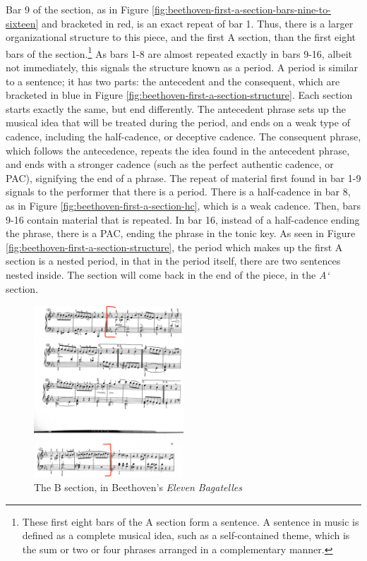 Bar 9 of the section, as in Figure \ref{fig:beethoven-first-a-section-bars-nine-to-sixteen}\autocite{Henle_1978} and bracketed in red, is an exact repeat of bar 1. Thus, there is a larger organizational structure to this piece, and the first A section, than the first eight bars of the section.\footnote{These first eight bars of the A section form a sentence. A sentence in music is defined as a complete musical idea, such as a self-contained theme, which is the sum or two or four phrases arranged in a complementary manner.} As bars 1-8 are almost repeated exactly in bars 9-16, albeit not immediately, this signals the structure known as a period. A period is similar to a sentence; it has two parts: the antecedent and the consequent, which are bracketed in blue in Figure \ref{fig:beethoven-first-a-section-structure}\autocite{Henle_1978}. Each section starts exactly the same, but end differently. The antecedent phrase sets up the musical idea that will be treated during the period, and ends on a weak type of cadence, including the half-cadence, or deceptive cadence. The consequent phrase, which follows the antecedence, repeats the idea found in the antecedent phrase, and ends with a stronger cadence (such as the perfect authentic cadence, or PAC), signifying the end of a phrase. The repeat of material first found in bar 1-9 signals to the performer that there is a period. There is a half-cadence in bar 8, as in Figure \ref{fig:beethoven-first-a-section-hc}\autocite{Henle_1978}, which is a weak cadence. Then, bars 9-16 contain material that is repeated. In bar 16, instead of a half-cadence ending the phrase, there is a PAC, ending the phrase in the tonic key. As seen in Figure \ref{fig:beethoven-first-a-section-structure}\autocite{Henle_1978}, the period which makes up the first A section is a nested period, in that in the period itself, there are two sentences nested inside. The section will come back in the end of the piece, in the \textit{A`} section. 

\begin{figure}
	\centering
	\includegraphics[width=0.5\textwidth]{figures/beethoven-b-section.jpg}
	\caption{The B section, in Beethoven's \textit{Eleven Bagatelles}}
	\label{fig:beethoven-b-section}
\end{figure}

